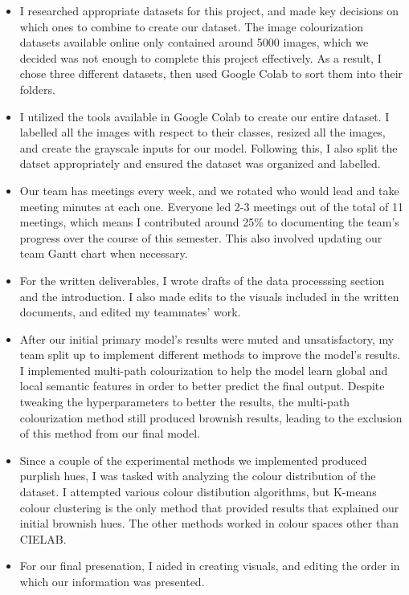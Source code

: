 \documentclass{article} %
\begin{document}
\begin{itemize}
    \item I researched appropriate datasets for this project, and made key decisions on which ones to combine to create our dataset. The image colourization datasets available online only contained around 5000 images, which we decided was not enough to complete this project effectively. As a result, I chose three different datasets, then used Google Colab to sort them into their folders. 
    \item I utilized the tools available in Google Colab to create our entire dataset. I labelled all the images with respect to their classes, resized all the images, and create the grayscale inputs for our model. Following this, I also split the datset appropriately and ensured the dataset was organized and labelled. 
    \item Our team has meetings every week, and we rotated who would lead and take meeting minutes at each one. Everyone led 2-3 meetings out of the total of 11 meetings,  which means I contributed around 25\% to documenting the team's progress over the course of this semester. This also involved updating our team Gantt chart when necessary. 
    \item For the written deliverables, I wrote drafts of the data processsing section and the introduction. I also made edits to the visuals included in the written documents, and edited my teammates' work. 
    \item After our initial primary model's results were muted and unsatisfactory, my team split up to implement different methods to improve the model's results. I implemented multi-path colourization to help the model learn global and local semantic features in order to better predict the final output. Despite tweaking the hyperparameters to better the results, the multi-path colourization method still produced brownish results, leading to the exclusion of this method from our final model. 
    \item Since a couple of the experimental methods we implemented produced purplish hues, I was tasked with analyzing the colour distribution of the dataset. I attempted various colour distibution algorithms, but K-means colour clustering is the only method that provided results that explained our initial brownish hues. The other methods worked in colour spaces other than CIELAB.
    \item For our final presenation, I aided in creating visuals, and editing the order in which our information was presented. 
\end{itemize}
\end{document}
